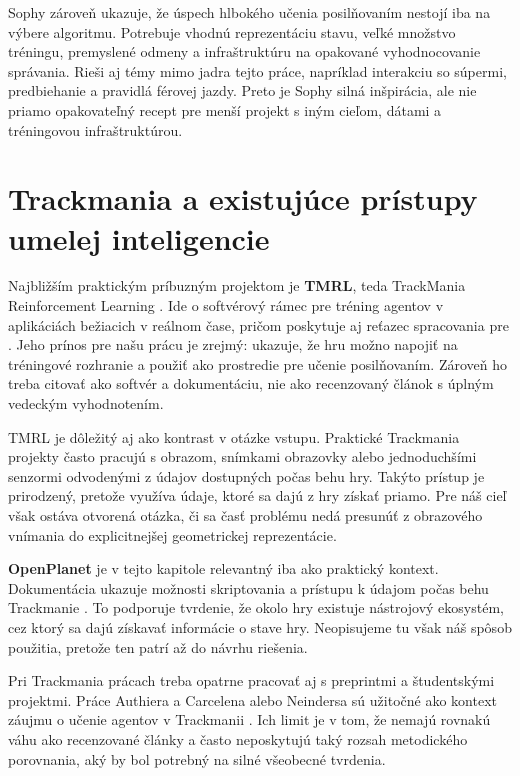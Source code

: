 Sophy zároveň ukazuje, že úspech hlbokého učenia posilňovaním nestojí iba na výbere algoritmu. Potrebuje vhodnú reprezentáciu stavu, veľké množstvo tréningu, premyslené odmeny a infraštruktúru na opakované vyhodnocovanie správania. Rieši aj témy mimo jadra tejto práce, napríklad interakciu so súpermi, predbiehanie a pravidlá férovej jazdy. Preto je Sophy silná inšpirácia, ale nie priamo opakovateľný recept pre menší projekt s iným cieľom, dátami a tréningovou infraštruktúrou.

\section{Trackmania a existujúce prístupy umelej inteligencie}

Najbližším praktickým príbuzným projektom je \textbf{TMRL}, teda TrackMania Reinforcement Learning \cite{tmrl_github2024}. Ide o softvérový rámec pre tréning agentov v aplikáciách bežiacich v reálnom čase, pričom poskytuje aj reťazec spracovania pre \Trackmania{}. Jeho prínos pre našu prácu je zrejmý: ukazuje, že hru možno napojiť na tréningové rozhranie a použiť ako prostredie pre učenie posilňovaním. Zároveň ho treba citovať ako softvér a dokumentáciu, nie ako recenzovaný článok s úplným vedeckým vyhodnotením.

TMRL je dôležitý aj ako kontrast v otázke vstupu. Praktické Trackmania projekty často pracujú s obrazom, snímkami obrazovky alebo jednoduchšími senzormi odvodenými z údajov dostupných počas behu hry. Takýto prístup je prirodzený, pretože využíva údaje, ktoré sa dajú z hry získať priamo. Pre náš cieľ však ostáva otvorená otázka, či sa časť problému nedá presunúť z obrazového vnímania do explicitnejšej geometrickej reprezentácie.

\textbf{OpenPlanet} je v tejto kapitole relevantný iba ako praktický kontext. Dokumentácia ukazuje možnosti skriptovania a prístupu k údajom počas behu Trackmanie \cite{openplanet_wiki2026}. To podporuje tvrdenie, že okolo hry existuje nástrojový ekosystém, cez ktorý sa dajú získavať informácie o stave hry. Neopisujeme tu však náš spôsob použitia, pretože ten patrí až do návrhu riešenia.

Pri Trackmania prácach treba opatrne pracovať aj s preprintmi a študentskými projektmi. Práce Authiera a Carcelena alebo Neindersa sú užitočné ako kontext záujmu o učenie agentov v Trackmanii \cite{trackmania_drl_preprint2024, neinders_trackmania_sophy2023}. Ich limit je v tom, že nemajú rovnakú váhu ako recenzované články a často neposkytujú taký rozsah metodického porovnania, aký by bol potrebný na silné všeobecné tvrdenia.

